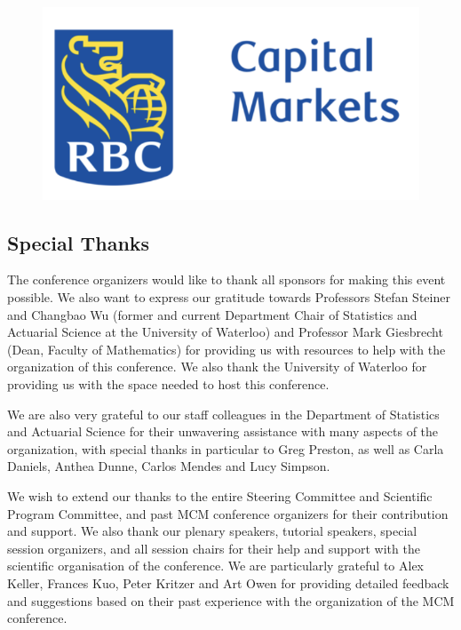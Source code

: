 \begin{figure}[ht]
\hfill
\includegraphics[scale =0.5]{Photos/RBC.png}
\end{figure}

\bigskip
\bigskip
\bigskip
% 

\clearpage
\subsection{Special Thanks}

The conference organizers would like to thank all sponsors for making this
event possible. We also want to express our gratitude towards 
Professors Stefan Steiner and Changbao Wu (former and current Department Chair of Statistics and Actuarial Science at the University of Waterloo) and Professor Mark Giesbrecht (Dean, Faculty of Mathematics) for providing us with resources to help with the organization of this conference. We also thank the University of Waterloo for providing us with the space needed to host this conference.


We are also very grateful to our staff colleagues in the Department of Statistics and Actuarial Science for their unwavering assistance with many aspects of the organization, with special thanks in particular to Greg Preston, as well as Carla Daniels, Anthea Dunne, Carlos Mendes and Lucy Simpson.


We wish to extend our thanks to the entire Steering Committee and
Scientific Program Committee, and past MCM conference organizers for their
contribution and support. We also thank our plenary speakers, tutorial
speakers, special session organizers, and all session chairs for their
help and support with the scientific organisation of the conference. We are particularly grateful to Alex Keller, Frances Kuo, Peter Kritzer and  Art Owen for providing detailed feedback and suggestions based on their past experience with the organization of the MCM conference.

